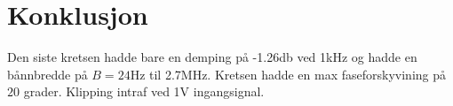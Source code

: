 
\section{Konklusjon}
\label{konklusjon}

Den siste kretsen hadde bare en demping på -1.26db ved 1kHz og hadde en bånnbredde på $B = 24$Hz til 2.7MHz. Kretsen hadde en max faseforskyvining på $20 $ grader. Klipping intraf ved 1V ingangsignal. 